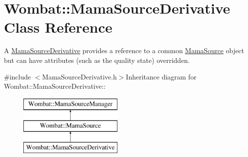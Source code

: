 \hypertarget{classWombat_1_1MamaSourceDerivative}{
\section{Wombat::MamaSourceDerivative Class Reference}
\label{classWombat_1_1MamaSourceDerivative}
}


A \hyperlink{classWombat_1_1MamaSourceDerivative}{MamaSourceDerivative} provides a reference to a common \hyperlink{classWombat_1_1MamaSource}{MamaSource} object but can have attributes (such as the quality state) overridden.  


{\ttfamily \#include $<$MamaSourceDerivative.h$>$}Inheritance diagram for Wombat::MamaSourceDerivative::\begin{figure}[H]
\begin{center}
\leavevmode
\includegraphics[height=3cm]{classWombat_1_1MamaSourceDerivative}
\end{center}
\end{figure}
